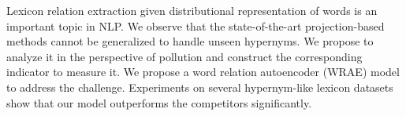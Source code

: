 Lexicon relation extraction given distributional representation of words is an important topic in NLP. We observe that the state-of-the-art projection-based methods cannot be generalized to handle unseen hypernyms. We propose to analyze it in the perspective of pollution and construct the corresponding indicator to measure it. We propose a word relation autoencoder (WRAE) model to address the challenge. Experiments on several hypernym-like lexicon datasets show that our model outperforms the competitors significantly.
